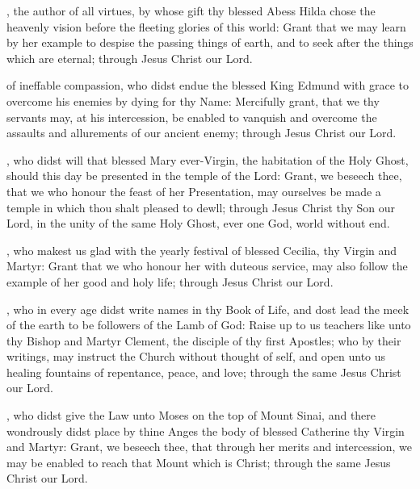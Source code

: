 , the author of all virtues, by whose gift thy blessed Abess Hilda chose the heavenly vision before the fleeting glories of this world: Grant that we may learn by her example to despise the passing things of earth, and to seek after the things which are eternal; through Jesus Christ our Lord.

 of ineffable compassion, who didst endue the blessed King Edmund with grace to overcome his enemies by dying for thy Name: Mercifully grant, that we thy servants may, at his intercession, be enabled to vanquish and overcome the assaults and allurements of our ancient enemy; through Jesus Christ our Lord.

, who didst will that blessed Mary ever-Virgin, the habitation of the Holy Ghost, should this day be presented in the temple of the Lord: Grant, we beseech thee, that we who honour the feast of her Presentation, may ourselves be made a temple in which thou shalt pleased to dewll; through Jesus Christ thy Son our Lord, in the unity of the same Holy Ghost, ever one God, world without end.

, who makest us glad with the yearly festival of blessed Cecilia, thy Virgin and Martyr: Grant that we who honour her with duteous service, may also follow the example of her good and holy life; through Jesus Christ our Lord.

, who in every age didst write names in thy Book of Life, and dost lead the meek of the earth to be followers of the Lamb of God: Raise up to us teachers like unto thy Bishop and Martyr Clement, the disciple of thy first Apostles; who by their writings, may instruct the Church without thought of self, and open unto us healing fountains of repentance, peace, and love; through the same Jesus Christ our Lord.

, who didst give the Law unto Moses on the top of Mount Sinai, and there wondrously didst place by thine Anges the body of blessed Catherine thy Virgin and Martyr: Grant, we beseech thee, that through her merits and intercession, we may be enabled to reach that Mount which is Christ; through the same Jesus Christ our Lord.


